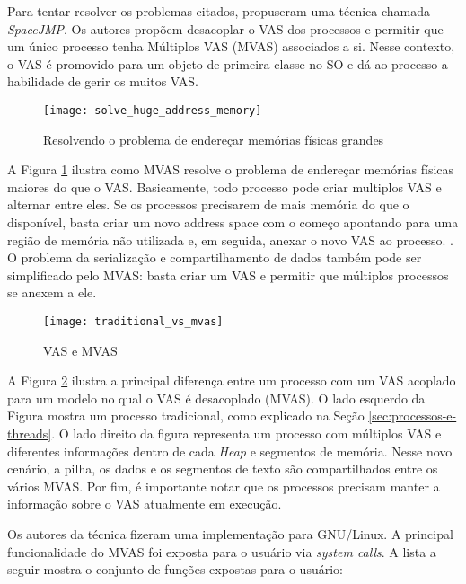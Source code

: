 Para tentar resolver os problemas citados, \citet{spacejmp} propuseram uma
técnica chamada \emph{SpaceJMP}. Os autores propõem desacoplar o VAS dos
processos e permitir que um único processo tenha Múltiplos VAS (MVAS)
associados a si. Nesse contexto, o VAS é promovido para um objeto de
primeira-classe no SO e dá ao processo a habilidade de gerir os muitos
VAS.

\begin{figure}[!h]
  \centering
  \texttt{[image: solve\_huge\_address\_memory]}
  \caption{Resolvendo o problema de endereçar memórias físicas grandes}
  \label{fig:large_memory}
\end{figure}

A Figura \ref{fig:large_memory} ilustra como MVAS resolve o problema de
endereçar memórias físicas maiores do que o VAS. Basicamente, todo processo
pode criar multiplos VAS e alternar entre eles. Se os processos precisarem de mais
memória do que o disponível, basta criar um novo address space com o começo
apontando para uma região de memória não utilizada e, em seguida, anexar o novo
VAS ao processo. . O problema da serialização e compartilhamento de dados também pode
ser simplificado pelo MVAS: basta criar um VAS e permitir que
múltiplos processos se anexem a ele.

\begin{figure}[!h]
  \centering
  \texttt{[image: traditional\_vs\_mvas]} 
	\caption[VAS e MVAS]{VAS e MVAS \citep{spacejmp}}
  \label{fig:traditional_vs_mvas} 
\end{figure}

A Figura \ref{fig:traditional_vs_mvas} ilustra a principal diferença entre um
processo com um VAS acoplado para um modelo no qual o VAS é desacoplado
(MVAS). O lado esquerdo da Figura mostra um processo tradicional, como explicado
na Seção \ref{sec:processos-e-threads}. O lado direito da figura representa um
processo com múltiplos VAS e diferentes informações dentro de cada \emph{Heap}
e segmentos de memória. Nesse novo cenário, a pilha, os dados e os segmentos
de texto são compartilhados entre os vários MVAS. Por fim, é importante
notar que os processos precisam manter a informação sobre o VAS atualmente em
execução.
 
Os autores da técnica fizeram uma implementação para GNU/Linux. A principal
funcionalidade do MVAS foi exposta para o usuário via \emph{system calls}. A
lista a seguir mostra o conjunto de funções expostas para o usuário:

